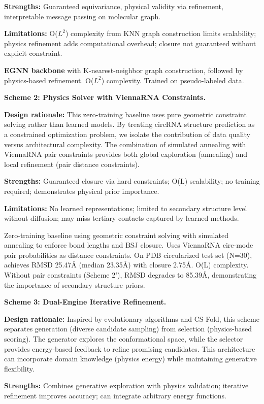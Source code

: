 \documentclass[12pt]{article}
\begin{document}
\textbf{Strengths:} Guaranteed equivariance, physical validity via refinement, interpretable message passing on molecular graph.

\textbf{Limitations:} O($L^2$) complexity from KNN graph construction limits scalability; physics refinement adds computational overhead; closure not guaranteed without explicit constraint.

\textbf{EGNN backbone} with K-nearest-neighbor graph construction, followed by physics-based refinement. O($L^2$) complexity. Trained on pseudo-labeled data.

\textbf{Scheme 2: Physics Solver with ViennaRNA Constraints.}

\textbf{Design rationale:} This zero-training baseline uses pure geometric constraint solving rather than learned models. By treating circRNA structure prediction as a constrained optimization problem, we isolate the contribution of data quality versus architectural complexity. The combination of simulated annealing with ViennaRNA pair constraints provides both global exploration (annealing) and local refinement (pair distance constraints).

\textbf{Strengths:} Guaranteed closure via hard constraints; O(L) scalability; no training required; demonstrates physical prior importance.

\textbf{Limitations:} No learned representations; limited to secondary structure level without diffusion; may miss tertiary contacts captured by learned methods.

Zero-training baseline using geometric constraint solving with simulated annealing to enforce bond lengths and BSJ closure. Uses ViennaRNA circ-mode pair probabilities as distance constraints. On PDB circularized test set (N=30), achieves RMSD 25.47Å (median 23.35Å) with closure 2.75Å. O(L) complexity. Without pair constraints (Scheme 2'), RMSD degrades to 85.39Å, demonstrating the importance of secondary structure priors.

\textbf{Scheme 3: Dual-Engine Iterative Refinement.}

\textbf{Design rationale:} Inspired by evolutionary algorithms and CS-Fold, this scheme separates generation (diverse candidate sampling) from selection (physics-based scoring). The generator explores the conformational space, while the selector provides energy-based feedback to refine promising candidates. This architecture can incorporate domain knowledge (physics energy) while maintaining generative flexibility.

\textbf{Strengths:} Combines generative exploration with physics validation; iterative refinement improves accuracy; can integrate arbitrary energy functions.
\end{document}
